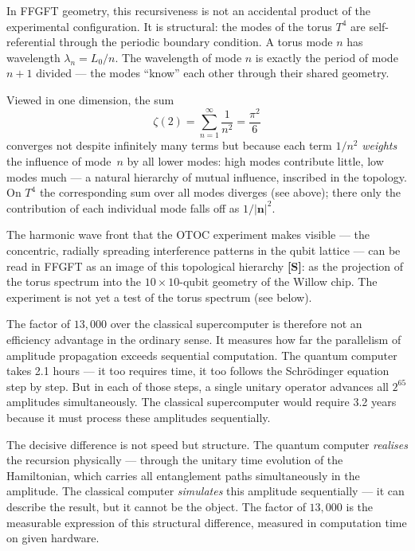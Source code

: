 In FFGFT geometry, this recursiveness is not an accidental product of the
experimental configuration. It is structural: the modes of the torus $T^4$ are
self-referential through the periodic boundary condition.
A torus mode $n$ has wavelength $\lambda_n = L_0/n$. The wavelength of mode $n$
is exactly the period of mode $n+1$ divided — the modes ``know'' each other through
their shared geometry.

Viewed in one dimension, the sum
\begin{equation}
    \zeta(2) = \sum_{n=1}^{\infty} \frac{1}{n^2} = \frac{\pi^2}{6}
\end{equation}
converges not despite infinitely many terms but because each term $1/n^2$
\emph{weights} the influence of mode~$n$ by all lower modes: high modes contribute
little, low modes much — a natural hierarchy of mutual influence, inscribed in the
topology. On $T^4$ the corresponding sum over all modes diverges (see above); there
only the contribution of each individual mode falls off as $1/|\mathbf{n}|^2$.

The harmonic wave front that the OTOC experiment makes visible — the concentric,
radially spreading interference patterns in the qubit lattice — can be read in FFGFT
as an image of this topological hierarchy \textbf{[S]}: as the projection of the torus
spectrum into the $10 \times 10$-qubit geometry of the Willow chip. The experiment is
not yet a test of the torus spectrum (see below).

The factor of $13{,}000$ over the classical supercomputer is therefore not an
efficiency advantage in the ordinary sense. It measures how far the parallelism
of amplitude propagation exceeds sequential computation. The quantum computer
takes 2.1 hours — it too requires time, it too follows the Schrödinger equation
step by step. But in each of those steps, a single unitary operator advances all
$2^{65}$ amplitudes simultaneously. The classical supercomputer would require
3.2 years because it must process these amplitudes sequentially.

\begin{foundation}
The decisive difference is not speed but structure.
The quantum computer \emph{realises} the recursion physically — through the unitary
time evolution of the Hamiltonian, which carries all entanglement paths simultaneously
in the amplitude.
The classical computer \emph{simulates} this amplitude sequentially — it can
describe the result, but it cannot be the object.
The factor of $13{,}000$ is the measurable expression of this structural difference,
measured in computation time on given hardware.
\end{foundation}


